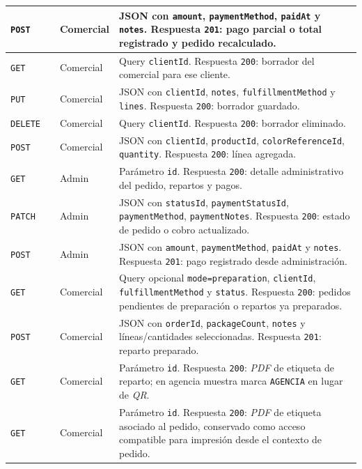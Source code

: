 {\begin{supertabular}{|A{0.10\textwidth}|A{0.27\textwidth}|A{0.15\textwidth}|A{0.38\textwidth}|}
\hline
\texttt{POST} &  & Comercial & JSON con \texttt{amount}, \texttt{paymentMethod}, \texttt{paidAt} y \texttt{notes}. Respuesta \texttt{201}: pago parcial o total registrado y pedido recalculado.\\
\hline
\texttt{GET} &  & Comercial & Query \texttt{clientId}. Respuesta \texttt{200}: borrador del comercial para ese cliente.\\
\hline
\texttt{PUT} &  & Comercial & JSON con \texttt{clientId}, \texttt{notes}, \texttt{fulfillmentMethod} y \texttt{lines}. Respuesta \texttt{200}: borrador guardado.\\
\hline
\texttt{DELETE} &  & Comercial & Query \texttt{clientId}. Respuesta \texttt{200}: borrador eliminado.\\
\hline
\texttt{POST} &  & Comercial & JSON con \texttt{clientId}, \texttt{productId}, \texttt{colorReferenceId}, \texttt{quantity}. Respuesta \texttt{200}: línea agregada.\\
\hline
\texttt{GET} &  & Admin & Parámetro \texttt{id}. Respuesta \texttt{200}: detalle administrativo del pedido, repartos y pagos.\\
\hline
\texttt{PATCH} &  & Admin & JSON con \texttt{statusId}, \texttt{paymentStatusId}, \texttt{paymentMethod}, \texttt{paymentNotes}. Respuesta \texttt{200}: estado de pedido o cobro actualizado.\\
\hline
\texttt{POST} &  & Admin & JSON con \texttt{amount}, \texttt{paymentMethod}, \texttt{paidAt} y \texttt{notes}. Respuesta \texttt{201}: pago registrado desde administración.\\
\hline
\texttt{GET} &  & Comercial & Query opcional \texttt{mode=preparation}, \texttt{clientId}, \texttt{fulfillmentMethod} y \texttt{status}. Respuesta \texttt{200}: pedidos pendientes de preparación o repartos ya preparados.\\
\hline
\texttt{POST} &  & Comercial & JSON con \texttt{orderId}, \texttt{packageCount}, \texttt{notes} y líneas/cantidades seleccionadas. Respuesta \texttt{201}: reparto preparado.\\
\hline
\texttt{GET} &  & Comercial & Parámetro \texttt{id}. Respuesta \texttt{200}: \textit{PDF} de etiqueta de reparto; en agencia muestra marca \texttt{AGENCIA} en lugar de \textit{QR}.\\
\hline
\texttt{GET} &  & Comercial & Parámetro \texttt{id}. Respuesta \texttt{200}: \textit{PDF} de etiqueta asociado al pedido, conservado como acceso compatible para impresión desde el contexto de pedido.\\
\hline
\end{supertabular}
}

